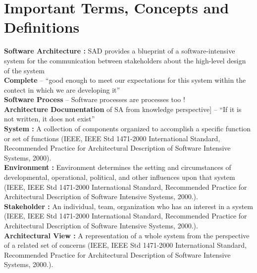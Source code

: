 \section{Important Terms, Concepts and Definitions}
\indent \textbf{Software Architecture : } SAD provides a blueprint of a software-intensive system for the communication between stakeholders about the high-level design of the system \cite{6923128}
\newline
\\\indent \textbf{Complete} – “good enough to meet our expectations for this system within the contect in which we are developing it”  \cite{BachmannDocumentingSoftware2010}
\newline
\\\indent \textbf{Software Process}  – Software processes are processes too ! \cite{Fuggeffa1988}
\newline
\\\indent \textbf{Architecture Documentation} of SA from knowledge perspective] – “If it is not written, it does not exist”
\newline
\\\indent \textbf{System : }A collection of components organized to accomplish a specific function or set of functions (IEEE, IEEE Std 1471-2000 International Standard, Recommended Practice for Architectural Description of Software Intensive Systems, 2000).
\newline
\\\indent \textbf{Environment : }Environment determines the setting and circumstances of developmental, operational, political, and other influences upon that system (IEEE, IEEE Std 1471-2000 International Standard, Recommended Practice for Architectural Description of Software Intensive Systems, 2000.). 
\newline
\\\indent \textbf{Stakeholder : } An individual, team, organization who has an interest in a system (IEEE, IEEE Std 1471-2000 International Standard, Recommended Practice for Architectural Description of Software Intensive Systems, 2000.).
\newline
\\\indent \textbf{Architectural View : } A representation of a whole system from the perspective of a related set of concerns (IEEE, IEEE Std 1471-2000 International Standard, Recommended Practice for Architectural Description of Software Intensive Systems, 2000.).



